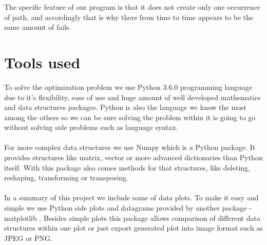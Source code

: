 \documentclass[conference]{IEEEtran}
\begin{document}
The specific feature of our program is that it does not create only one occurrence of path, and accordingly that is why there from time to time appears to be the same amount of fails. 

\section{Tools used}
To solve the optimization problem we use Python 3.6.0 \cite{python} programming language due to it's flexibility, ease of use and huge amount of well developed mathematics and data structures packages. Python is also the language we know the most among the others so we can be sure solving the problem within it is going to go without solving side problems such as language syntax.
\\ \\
For more complex data structures we use Numpy \cite{numpy} which is a Python package. It provides structures like matrix, vector or more advanced dictionaries than Python itself. With this package also comes methods for that structures, like deleting, reshaping, transforming or transposing.
\\ \\
In a summary of this project we include some of data plots. To make it easy and simple we use Python side plots and datagrams provided by another package - matplotlib \cite{matplotlib}. Besides simple plots this package allows comparison of different data structures within one plot or just export generated plot into image format such as JPEG or PNG.
\\
\end{document}
